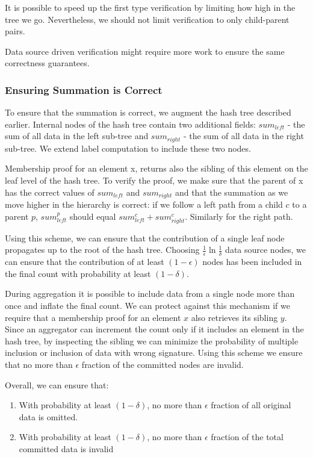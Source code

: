 \documentclass{article}
\begin{document}
It is possible to speed up the first type verification by limiting how
high in the tree we go. Nevertheless, we should not limit verification
to only child-parent pairs.

Data source driven verification might require more work to ensure the
same correctness guarantees.


\subsubsection{Ensuring Summation is Correct}
To ensure that the summation is correct, we augment the hash tree
described earlier. Internal nodes of the hash tree contain two
additional fields: $sum_{left}$ - the sum of all data in the left
sub-tree and $sum_{right}$ - the sum of all data in the right
sub-tree. We extend label computation to include these two nodes.

Membership proof for an element x, returns also the sibling of this
element on the leaf level of the hash tree. To verify the proof, we
make sure that the 
parent of x has the correct values of $sum_{left}$ and $sum_{right}$
and that the summation as we move higher in the hierarchy is correct:
if we follow a left path from a child $c$ to a parent $p$,
$sum_{left}^p$ should equal $sum_{left}^c + sum_{right}^c$. Similarly
for the right path.

Using this scheme, we can ensure that the contribution of a single
leaf node propagates up to the root of the hash tree. Choosing
$\frac{1}{\epsilon}\ln{\frac{1}{\delta}}$ data source nodes, we can
ensure that the contribution of at least $(1-\epsilon)$ nodes has been
included in the final count with probability at least $(1-\delta)$.

During aggregation it is possible to include data from a single node
more than once and inflate the final count. We can protect against
this mechanism if we require that a membership proof for an element $x$
also retrieves its sibling $y$. Since an aggregator can
increment the count only if it includes an element in the hash tree,
by inspecting the sibling we can minimize the probability of
multiple inclusion or inclusion of data with wrong signature. Using
this scheme we ensure that no more than $\epsilon$ fraction of the
committed nodes are invalid.


Overall, we can ensure that:
\begin{enumerate}
\item  With probability at least $(1-\delta)$, no more than $\epsilon$ fraction of all
original data is omitted.
\item With probability at least $(1-\delta)$, no more than $\epsilon$
  fraction of the total committed data is invalid
\end{enumerate}
\end{document}
